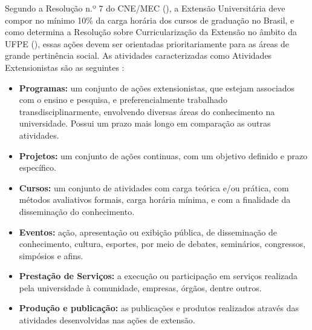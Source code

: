 Segundo a Resolução n.º 7 do \gls{CNE}/\gls{MEC} (\citeyear{cne2018}), a Extensão Universitária deve compor no mínimo 10\% da carga horária dos cursos de graduação no Brasil, e como determina a Resolução sobre Curricularização da Extensão no âmbito da \gls{UFPE} (\citeyear{ufpe2022}), essas ações devem ser orientadas prioritariamente para as áreas de grande pertinência social. As atividades caracterizadas como Atividades Extensionistas são as seguintes \cite{proexuepb}:
\begin{itemize}
    \item \textbf{Programas:} um conjunto de ações extensionistas, que estejam associados com o ensino e pesquisa, e preferencialmente trabalhado transdisciplinarmente, envolvendo diversas áreas do conhecimento na universidade. Possui um prazo mais longo em comparação as outras atividades.
    \item \textbf{Projetos:} um conjunto de ações continuas, com um objetivo definido e prazo específico.
    \item \textbf{Cursos:} um conjunto de atividades com carga teórica e/ou prática, com métodos avaliativos formais, carga horária mínima, e com a finalidade da disseminação do conhecimento.
    \item \textbf{Eventos:} ação, apresentação ou exibição pública, de disseminação de conhecimento, cultura, esportes, por meio de debates, seminários, congressos, simpósios e afins.
    \item \textbf{Prestação de Serviços:} a execução ou participação em serviços realizada pela universidade à comunidade, empresas, órgãos, dentre outros.
    \item \textbf{Produção e publicação:} as publicações e produtos realizados através das atividades desenvolvidas nas ações de extensão.
\end{itemize}